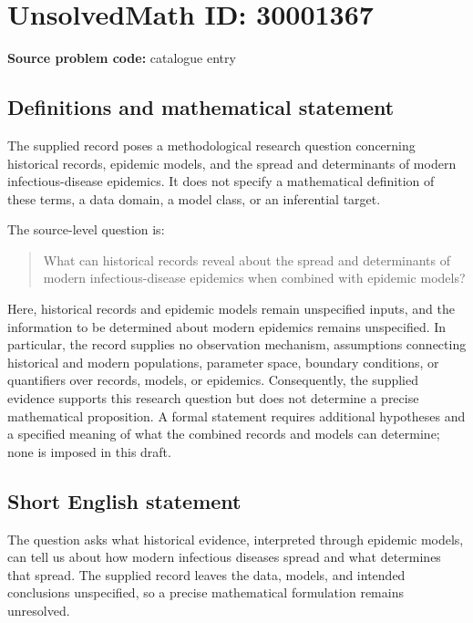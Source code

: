 \documentclass[11pt]{article}
\begin{document}
\section*{UnsolvedMath ID: 30001367}
\textbf{Source problem code:} catalogue entry
\subsection{Definitions and mathematical statement}
The supplied record poses a methodological research question concerning historical records, epidemic models, and the spread and determinants of modern infectious-disease epidemics. It does not specify a mathematical definition of these terms, a data domain, a model class, or an inferential target.

The source-level question is:
\begin{quote}
What can historical records reveal about the spread and determinants of modern infectious-disease epidemics when combined with epidemic models?
\end{quote}

Here, historical records and epidemic models remain unspecified inputs, and the information to be determined about modern epidemics remains unspecified. In particular, the record supplies no observation mechanism, assumptions connecting historical and modern populations, parameter space, boundary conditions, or quantifiers over records, models, or epidemics. Consequently, the supplied evidence supports this research question but does not determine a precise mathematical proposition. A formal statement requires additional hypotheses and a specified meaning of what the combined records and models can determine; none is imposed in this draft.
\subsection{Short English statement}
The question asks what historical evidence, interpreted through epidemic models, can tell us about how modern infectious diseases spread and what determines that spread. The supplied record leaves the data, models, and intended conclusions unspecified, so a precise mathematical formulation remains unresolved.
\end{document}
